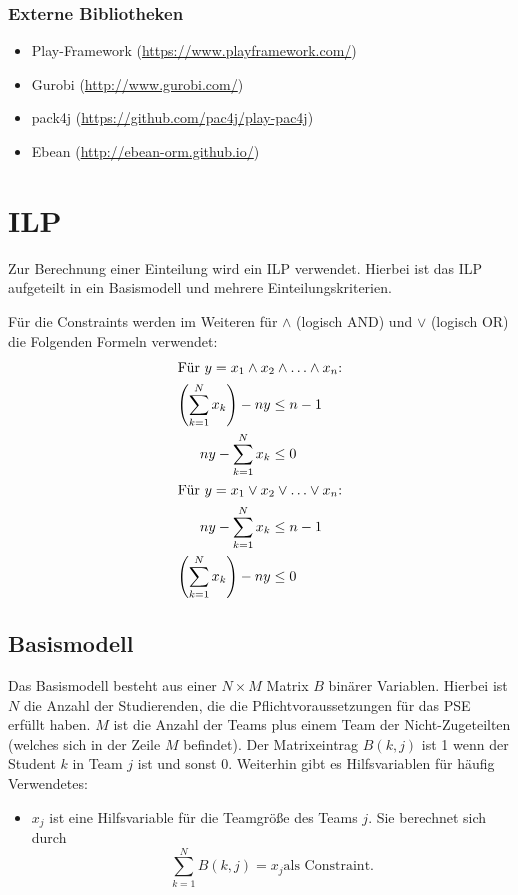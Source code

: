 \documentclass[parskip=full]{scrartcl}
\begin{document}
   \subsubsection{Externe Bibliotheken}
\begin{itemize}
    \item Play-Framework (\url{https://www.playframework.com/})
    \item Gurobi (\url{http://www.gurobi.com/})
    \item pack4j (\url{https://github.com/pac4j/play-pac4j})
    \item Ebean (\url{http://ebean-orm.github.io/})
   \end{itemize}
   \pagebreak
   
   \section{ILP}
Zur Berechnung einer Einteilung wird ein ILP verwendet. Hierbei ist das ILP
aufgeteilt in ein Basismodell und mehrere Einteilungskriterien. 

Für die Constraints werden im Weiteren für $\wedge$ (logisch AND) und
$\vee$ (logisch OR) die Folgenden Formeln verwendet:
\begin{align*}
\intertext{Für $y = x_1 \wedge x_2 \wedge \ldots \wedge x_n$:} 
\left(\sum_{k=1}^{N}x_k \right)-ny & \le n-1\\
ny - \sum_{k=1}^{N}x_k & \le 0\\
\intertext{Für  $y = x_1 \vee x_2 \vee \ldots \vee x_n$:}
ny - \sum_{k=1}^{N}x_k & \le n-1\\
\left(\sum_{k=1}^{N}x_k \right) - ny  &\le 0
\end{align*}
\subsection{Basismodell}
Das Basismodell besteht aus einer $N \times M$ Matrix $B$ binärer Variablen.
Hierbei ist $N$ die Anzahl der Studierenden, die die Pflichtvoraussetzungen für das PSE
erfüllt haben. $M$ ist die Anzahl der Teams plus einem Team
der Nicht-Zugeteilten (welches sich in der Zeile $M$ befindet). Der
Matrixeintrag $B(k,j)$ ist 1 wenn der Student $k$ in Team $j$ ist und sonst 0.
Weiterhin gibt es Hilfsvariablen für häufig Verwendetes: 
\begin{itemize}
  \item $x_j$ ist eine Hilfsvariable für die Teamgröße des Teams $j$. Sie berechnet
sich durch
\begin{equation*}
\sum_{k = 1}^{N} B(k,j) = x_j  \text{
als Constraint.}
\end{equation*}
\end{itemize}
\end{document}
